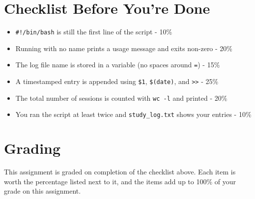 \documentclass[11pt]{article}
\begin{document}
\section{Checklist Before You're Done}
\begin{itemize}
    \item \texttt{\#!/bin/bash} is still the first line of the script - 10\%
    \item Running with no name prints a usage message and exits non-zero - 20\%
    \item The log file name is stored in a variable (no spaces around \texttt{=}) - 15\%
    \item A timestamped entry is appended using \texttt{\$1}, \texttt{\$(date)}, and \texttt{>{}>} - 25\%
    \item The total number of sessions is counted with \texttt{wc -l} and printed - 20\%
    \item You ran the script at least twice and \texttt{study\_log.txt} shows your entries - 10\%
\end{itemize}

\section{Grading}
This assignment is graded on completion of the checklist above. Each item is worth the percentage listed next to it, and the items add up to 100\% of your grade on this assignment.
\end{document}
